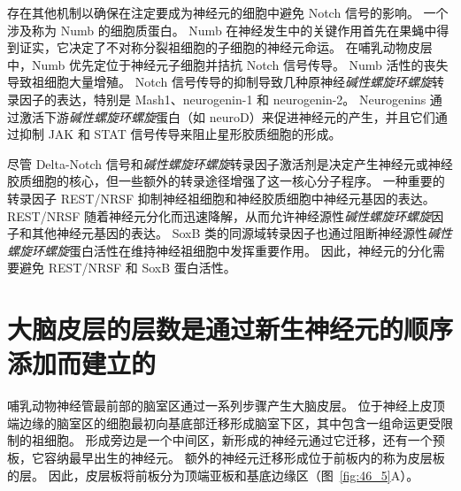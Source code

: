 存在其他机制以确保在注定要成为神经元的细胞中避免 Notch 信号的影响。
一个涉及称为 Numb 的细胞质蛋白。
Numb 在神经发生中的关键作用首先在果蝇中得到证实，它决定了不对称分裂祖细胞的子细胞的神经元命运。
在哺乳动物皮层中，Numb 优先定位于神经元子细胞并拮抗 Notch 信号传导。
Numb 活性的丧失导致祖细胞大量增殖。
Notch 信号传导的抑制导致几种原神经\textit{碱性螺旋环螺旋}转录因子的表达，特别是 Mash1、neurogenin-1 和 neurogenin-2。
Neurogenins 通过激活下游\textit{碱性螺旋环螺旋}蛋白（如 neuroD）来促进神经元的产生，并且它们通过抑制 JAK 和 STAT 信号传导来阻止星形胶质细胞的形成。


尽管 Delta-Notch 信号和\textit{碱性螺旋环螺旋}转录因子激活剂是决定产生神经元或神经胶质细胞的核心，但一些额外的转录途径增强了这一核心分子程序。
一种重要的转录因子 REST/NRSF 抑制神经祖细胞和神经胶质细胞中神经元基因的表达。
REST/NRSF 随着神经元分化而迅速降解，从而允许神经源性\textit{碱性螺旋环螺旋}因子和其他神经元基因的表达。
SoxB 类的同源域转录因子也通过阻断神经源性\textit{碱性螺旋环螺旋}蛋白活性在维持神经祖细胞中发挥重要作用。
因此，神经元的分化需要避免 REST/NRSF 和 SoxB 蛋白活性。



\section{大脑皮层的层数是通过新生神经元的顺序添加而建立的}

哺乳动物神经管最前部的脑室区通过一系列步骤产生大脑皮层。
位于神经上皮顶端边缘的脑室区的细胞最初向基底部迁移形成脑室下区，其中包含一组命运更受限制的祖细胞。
形成旁边是一个中间区，新形成的神经元通过它迁移，还有一个预板，它容纳最早出生的神经元。
额外的神经元迁移形成位于前板内的称为皮层板的层。 
因此，皮层板将前板分为顶端亚板和基底边缘区（图~\ref{fig:46_5}A）。


